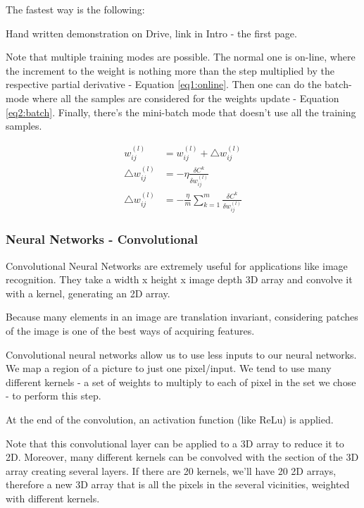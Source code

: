 The fastest way is the following:

Hand written demonstration on Drive, link in Intro - the first page.

\vspace{1cm}

Note that multiple training modes are possible. The normal one is on-line, where the increment to the weight is nothing more than the step multiplied by the respective partial derivative - Equation \eqref{eq1:online}. Then one can do the batch-mode where all the samples are considered for the weights update - Equation \eqref{eq2:batch}. Finally, there's the mini-batch mode that doesn't use all the training samples.

\begin{align}
    w_{ij}^{(l)} &= w_{ij}^{(l)} + \bigtriangleup w_{ij}^{(l)} \\
    \bigtriangleup w_{ij}^{(l)} &= -\eta \frac{\delta C^k}{\delta w_{ij}^{(l)}} \label{eq1:online} \\
    \bigtriangleup w_{ij}^{(l)} &= -\frac{\eta}{m} \sum_{k=1}^m  \frac{\delta C^k}{\delta w_{ij}^{(l)}} \label{eq2:batch}
\end{align}



\subsubsection{Neural Networks - Convolutional} 

Convolutional Neural Networks are extremely useful for applications like image recognition. They take a width x height x image depth 3D array and convolve it with a kernel, generating an 2D array. 

Because many elements in an image are translation invariant, considering patches of the image is one of the best ways of acquiring features.

Convolutional neural networks allow us to use less inputs to our neural networks. We map a region of a picture to just one pixel/input. We tend to use many different kernels - a set of weights to multiply to each of pixel in the set we chose - to perform this step.




At the end of the convolution, an activation function (like ReLu) is applied.

Note that this convolutional layer can be applied to a 3D array to reduce it to 2D. Moreover, many different kernels can be convolved with the section of the 3D array creating several layers. If there are 20 kernels, we'll have 20 2D arrays, therefore a new 3D array that is all the pixels in the several vicinities, weighted with different kernels.

